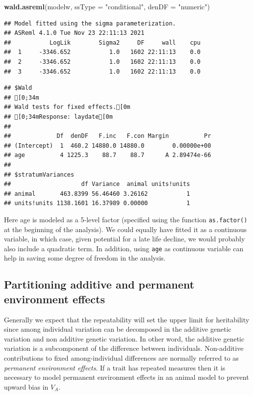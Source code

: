 \documentclass[
  12pt,
]{book}
\newenvironment{Shaded}{\begin{snugshade}}{\end{snugshade}}
\newcommand{\DataTypeTok}[1]{\textcolor[rgb]{0.13,0.29,0.53}{#1}}
\newcommand{\KeywordTok}[1]{\textcolor[rgb]{0.13,0.29,0.53}{\textbf{#1}}}
\newcommand{\NormalTok}[1]{#1}
\newcommand{\StringTok}[1]{\textcolor[rgb]{0.31,0.60,0.02}{#1}}
\begin{document}
\begin{Shaded}
\begin{Highlighting}[]
\KeywordTok{wald.asreml}\NormalTok{(modelw, }\DataTypeTok{ssType =} \StringTok{"conditional"}\NormalTok{, }\DataTypeTok{denDF =} \StringTok{"numeric"}\NormalTok{)}
\end{Highlighting}
\end{Shaded}

\begin{verbatim}
## Model fitted using the sigma parameterization.
## ASReml 4.1.0 Tue Nov 23 22:11:13 2021
##           LogLik        Sigma2     DF     wall    cpu
##  1     -3346.652           1.0   1602 22:11:13    0.0
##  2     -3346.652           1.0   1602 22:11:13    0.0
##  3     -3346.652           1.0   1602 22:11:13    0.0
\end{verbatim}

\begin{verbatim}
## $Wald
## [0;34m
## Wald tests for fixed effects.[0m
## [0;34mResponse: laydate[0m
## 
##             Df  denDF   F.inc   F.con Margin          Pr
## (Intercept)  1  460.2 14880.0 14880.0        0.00000e+00
## age          4 1225.3    88.7    88.7      A 2.89474e-66
## 
## $stratumVariances
##                    df Variance  animal units!units
## animal       463.8399 56.46460 3.26162           1
## units!units 1138.1601 16.37989 0.00000           1
\end{verbatim}

Here age is modeled as a 5-level factor (specified using the function \texttt{as.factor()} at the beginning of the analysis). We could equally have fitted it as a continuous variable, in which case, given potential for a late life decline, we would probably also include a quadratic term.
In addition, using \texttt{age} as continuous variable can help in saving some degree of freedom in the analysis.

\hypertarget{partitioning-additive-and-permanent-environment-effects}{%
\subsection{Partitioning additive and permanent environment effects}\label{partitioning-additive-and-permanent-environment-effects}}

Generally we expect that the repeatability will set the upper limit for heritability since among individual variation can be decomposed in the additive genetic variation and non additive genetic variation. In other word, the additive genetic variation is a subcomponent of the difference between individuals.
Non-additive contributions to fixed among-individual differences are normally referred to as \emph{permanent environment effects}. If a trait has repeated measures then it is necessary to model permanent environment effects in an animal model to prevent upward bias in \(V_A\).
\end{document}
